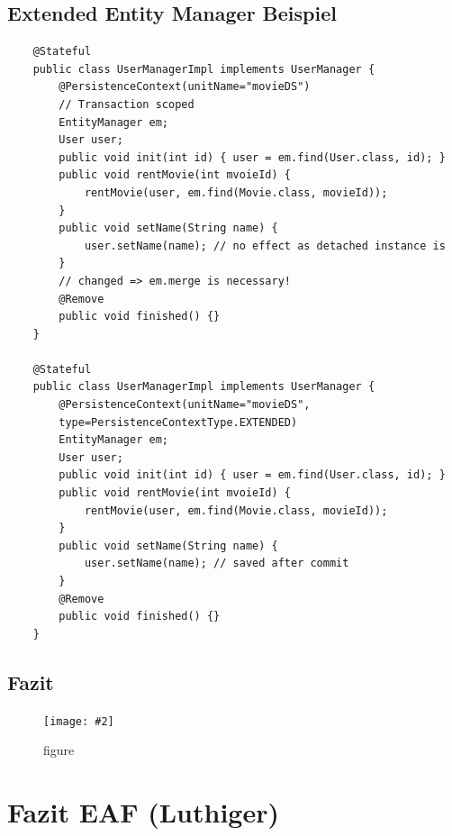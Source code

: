 \documentclass[a4paper,10pt]{scrreprt}
\newcommand{\pic}[2][figure]{\begin{figure}[h]
 \centering
 \texttt{[image: \#2]}
 \caption{#1}
\end{figure}
}
\begin{document}
\section{Extended Entity Manager Beispiel}
\begin{lstlisting}
	@Stateful
	public class UserManagerImpl implements UserManager {
		@PersistenceContext(unitName="movieDS")
		// Transaction scoped
		EntityManager em;
		User user;
		public void init(int id) { user = em.find(User.class, id); }
		public void rentMovie(int mvoieId) {
			rentMovie(user, em.find(Movie.class, movieId));
		}
		public void setName(String name) {
			user.setName(name); // no effect as detached instance is
		}
		// changed => em.merge is necessary!
		@Remove
		public void finished() {}
	}

	@Stateful
	public class UserManagerImpl implements UserManager {
		@PersistenceContext(unitName="movieDS",
		type=PersistenceContextType.EXTENDED)
		EntityManager em;
		User user;
		public void init(int id) { user = em.find(User.class, id); }
		public void rentMovie(int mvoieId) {
			rentMovie(user, em.find(Movie.class, movieId));
		}
		public void setName(String name) {
			user.setName(name); // saved after commit
		}
		@Remove
		public void finished() {}
	}
\end{lstlisting}

\section{Fazit}
\pic{fz.png}

\chapter{Fazit EAF (Luthiger)}
\end{document}
